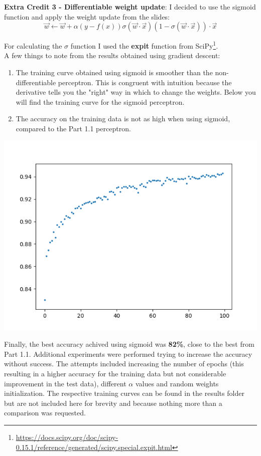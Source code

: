 \documentclass[11pt]{article}
\begin{document}
\textbf{Extra Credit 3 - Differentiable weight update}: I decided to use the sigmoid function and apply the weight update from the slides:
\[ \vec{w} \leftarrow \vec{w} + \alpha (y - f(x))\sigma(\vec{w}\cdot \vec{x})(1 - \sigma(\vec{w}\cdot \vec{x}))\cdot \vec{x} \]

For calculating the $\sigma$ function I used the \textbf{expit} function from SciPy\footnote{\url{https://docs.scipy.org/doc/scipy-0.15.1/reference/generated/scipy.special.expit.html}}. \\

A few things to note from the results obtained using gradient descent:\\
\begin{enumerate}
\item The training curve obtained using sigmoid is smoother than the non-differentiable perceptron. This is congruent with intuition because the derivative tells you the "right" way in which to change the weights. Below you will find the training curve for the sigmoid perceptron.

\item The accuracy on the training data is not as high when using sigmoid, compared to the Part 1.1 perceptron.
\end{enumerate}

\begin{center}
\includegraphics[scale=0.75]{part1.ec3/sigmoid-constant.png}
\end{center}

Finally, the best accuracy achived using sigmoid was \textbf{82\%}, close to the best from Part 1.1. Additional experiments were performed trying to increase the accuracy without success. The attempts included increasing the number of epochs (this resulting in a higher accuracy for the training data but not considerable improvement in the test data), different $\alpha$ values and random weights initialization. The respective training curves can be found in the results folder but are not included here for brevity and because nothing more than a comparison was requested. \\
\end{document}
